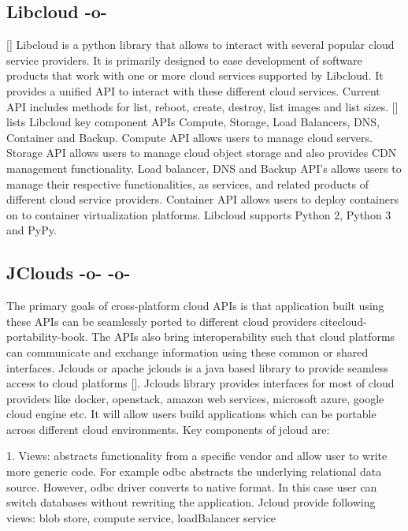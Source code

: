      
\subsection{Libcloud -o-}

[\cite{www-libcloudwiki}] Libcloud is a python library that allows to
interact with several popular cloud service providers. It is primarily
designed to ease development of software products that work with one
or more cloud services supported by Libcloud. It provides a unified
API to interact with these different cloud services. Current API
includes methods for list, reboot, create, destroy, list images and
list sizes. [\cite{www-libclouddoc}] lists Libcloud key component APIs
Compute, Storage, Load Balancers, DNS, Container and Backup. Compute
API allows users to manage cloud servers. Storage API allows users to
manage cloud object storage and also provides CDN management
functionality. Load balancer, DNS and Backup API's allows users to
manage their respective functionalities, as services, and related
products of different cloud service providers. Container API allows
users to deploy containers on to container virtualization
platforms. Libcloud supports Python 2, Python 3 and PyPy.


     
\subsection{JClouds -o- -o-}

The primary goals of cross-platform cloud APIs is that application
built using these APIs can be seamlessly ported to different cloud
providers cite{cloud-portability-book}.  The APIs also bring
interoperability such that cloud platforms can communicate and
exchange information using these common or shared interfaces.  Jclouds
or apache jclouds is a java based library to provide seamless access
to cloud platforms [\cite{www-jclouds}].  Jclouds library provides
interfaces for most of cloud providers like docker, openstack, amazon
web services, microsoft azure, google cloud engine etc. It will allow
users build applications which can be portable across different cloud
environments.  Key components of jcloud are:

     1. Views: abstracts functionality from a specific vendor and
        allow user to write more generic code. For example odbc
        abstracts the underlying relational data source. However, odbc
        driver converts to native format. In this case user can switch
        databases without rewriting the application. Jcloud provide
        following views: blob store, compute service, loadBalancer
        service

